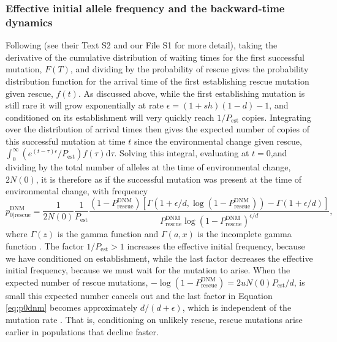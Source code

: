 \documentclass[]{article}
\begin{document}
\subsubsection*{Effective initial allele frequency and the backward-time dynamics}

Following \cite{orr2014population} (see their Text S2 and our File S1 for more detail), taking the derivative of the cumulative distribution of waiting times for the first successful mutation, $F(T)$, and dividing by the probability of rescue gives the probability distribution function for the arrival time of the first establishing rescue mutation given rescue, $f(t)$.
As discussed above, while the first establishing mutation is still rare it will grow exponentially at rate $\epsilon = (1+s h)(1-d) - 1$, and conditioned on its establishment will very quickly reach $1/P_\mathrm{est}$ copies. 
Integrating over the distribution of arrival times then gives the expected number of copies of this successful mutation at time $t$ since the environmental change given rescue, $\int_0^\infty (e^{(t-\tau) \epsilon} / P_\mathrm{est}) f(\tau) \mathrm{d}\tau$.
Solving this integral, evaluating at $t=0$,and dividing by the total number of alleles at the time of environmental change, $2N(0)$, it is therefore as if the successful mutation was present at the time of environmental change, with frequency
\begin{equation}\label{eq:p0dnm}
p_{0|\mathrm{rescue}}^{\mathrm{DNM}} = \frac{1}{2N(0)}\frac{1}{P_\mathrm{est}} \frac{(1-P_{\mathrm{rescue}}^{\mathrm{DNM}}) \left[\Gamma\left(1+\epsilon/d,\log(1-P_{\mathrm{rescue}}^{\mathrm{DNM}})\right) - \Gamma\left(1+\epsilon/d\right) \right]}{P_{\mathrm{rescue}}^{\mathrm{DNM}} \log(1-P_{\mathrm{rescue}}^{\mathrm{DNM}})^{\epsilon/d}},
\end{equation}
where $\Gamma(z)$ is the gamma function \citep[equation 6.1.1 in][]{abramowitz1972handbook} and $\Gamma(a,x)$ is the incomplete gamma function \citep[equation 6.5.3 in][]{abramowitz1972handbook}.
The factor $1/P_\mathrm{est}>1$ increases the effective initial frequency, because we have conditioned on establishment, while the last factor decreases the effective initial frequency, because we must wait for the mutation to arise.
When the expected number of rescue mutations, $-\log(1-P_{\mathrm{rescue}}^{\mathrm{DNM}}) = 2 u N(0) P_\mathrm{est} / d$, is small this expected number cancels out and the last factor in Equation \ref{eq:p0dnm} becomes approximately $d/(d+\epsilon)$, which is independent of the mutation rate \citep[as in the haploid case;][]{orr2014population}.
That is, conditioning on unlikely rescue, rescue mutations arise earlier in populations that decline faster.
\end{document}
